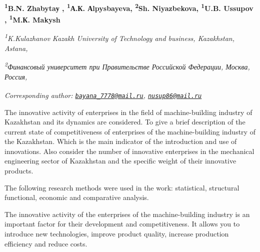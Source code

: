 
\begin{articleheader}

{\bfseries 
\textsuperscript{1}B.N. Zhabytaу\textsuperscript{\envelope } ,
\textsuperscript{1}А.К. Аlpysbayeva,
\textsuperscript{2}Sh. Niyazbekova,
\textsuperscript{1}U.B. Ussupov\textsuperscript{\envelope } ,
\textsuperscript{1}M.К. Makysh}
\end{articleheader}

\begin{affiliation}
\emph{\textsuperscript{1}K.Kulazhanov Kazakh University of Technology and business, Kazakhstan, Astana,}

\emph{\textsuperscript{2}Финансовый университет при Правительстве Российской Федерации, Москва, Россия,}

\raggedright \textsuperscript{\envelope }{\em Corresponding author: \href{mailto:bayana_7778@mail.ru}{\nolinkurl{bayana\_7778@mail.ru}}, \href{mailto:nusup86@mail.ru}{\nolinkurl{nusup86@mail.ru}}}
\end{affiliation}

The innovative activity of enterprises in the field of machine-building
industry of Kazakhstan and its dynamics are considered. To give a brief
description of the current state of competitiveness of enterprises of
the machine-building industry of the Kazakhstan. Which is the main
indicator of the introduction and use of innovations. Also consider the
number of innovative enterprises in the mechanical engineering sector of
Kazakhstan and the specific weight of their innovative products.

The following research methods were used in the work: statistical,
structural functional, economic and comparative analysis.

The innovative activity of the enterprises of the machine-building
industry is an important factor for their development and
competitiveness. It allows you to introduce new technologies, improve
product quality, increase production efficiency and reduce costs.


